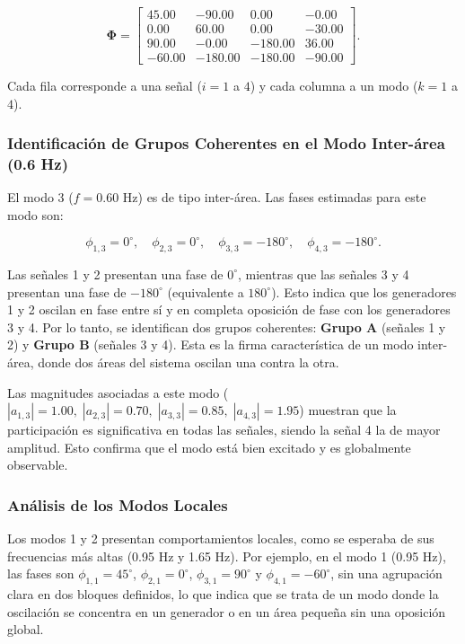 \documentclass[conference]{IEEEtran}
\begin{document}
\begin{equation}
\mathbf{\Phi} = 
\begin{bmatrix}
 45.00 & -90.00 &   0.00 &  -0.00 \\
  0.00 &  60.00 &   0.00 & -30.00 \\
 90.00 &  -0.00 & -180.00 &  36.00 \\
-60.00 & -180.00 & -180.00 & -90.00
\end{bmatrix}.
\end{equation}

Cada fila corresponde a una señal (\(i = 1\) a \(4\)) y cada columna a un modo (\(k = 1\) a \(4\)).

\subsubsection{Identificación de Grupos Coherentes en el Modo Inter-área (0.6 Hz)}
El modo 3 (\(f = 0.60\) Hz) es de tipo inter-área. Las fases estimadas para este modo son:

\begin{equation}
\phi_{1,3} = 0^\circ,\quad \phi_{2,3} = 0^\circ,\quad \phi_{3,3} = -180^\circ,\quad \phi_{4,3} = -180^\circ.
\end{equation}

Las señales 1 y 2 presentan una fase de \(0^\circ\), mientras que las señales 3 y 4 presentan una fase de \(-180^\circ\) (equivalente a \(180^\circ\)). Esto indica que los generadores 1 y 2 oscilan en fase entre sí y en completa oposición de fase con los generadores 3 y 4. Por lo tanto, se identifican dos grupos coherentes: \textbf{Grupo A} (señales 1 y 2) y \textbf{Grupo B} (señales 3 y 4). Esta es la firma característica de un modo inter-área, donde dos áreas del sistema oscilan una contra la otra.

Las magnitudes asociadas a este modo (\(|a_{1,3}| = 1.00,\; |a_{2,3}| = 0.70,\; |a_{3,3}| = 0.85,\; |a_{4,3}| = 1.95\)) muestran que la participación es significativa en todas las señales, siendo la señal 4 la de mayor amplitud. Esto confirma que el modo está bien excitado y es globalmente observable.

\subsubsection{Análisis de los Modos Locales}
Los modos 1 y 2 presentan comportamientos locales, como se esperaba de sus frecuencias más altas (0.95 Hz y 1.65 Hz). Por ejemplo, en el modo 1 (0.95 Hz), las fases son \(\phi_{1,1}=45^\circ\), \(\phi_{2,1}=0^\circ\), \(\phi_{3,1}=90^\circ\) y \(\phi_{4,1}=-60^\circ\), sin una agrupación clara en dos bloques definidos, lo que indica que se trata de un modo donde la oscilación se concentra en un generador o en un área pequeña sin una oposición global. 
\end{document}
